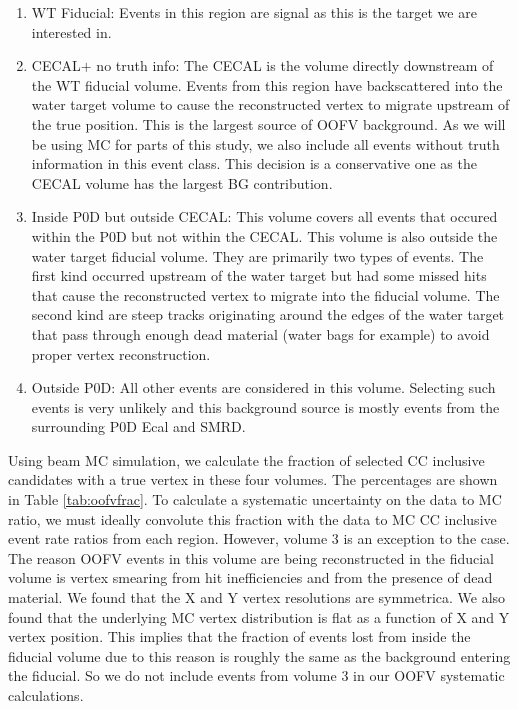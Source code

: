 \begin{enumerate}
\item WT Fiducial: Events in this region are signal as this is the target we are interested in.
\item CECAL$+$ no truth info: The CECAL is the volume directly downstream of the WT fiducial volume. Events from this region have backscattered into the water target volume to cause the reconstructed vertex to migrate upstream of the true position. This is the largest source of OOFV background. As we will be using MC for parts of this study, we also include all events without truth information in this event class. This decision is a conservative one as the CECAL volume has the largest BG contribution.
\item Inside P0D but outside CECAL: This volume covers all events that occured within the P0D but not within the CECAL. This volume is also outside the water target fiducial volume. They are primarily two types of events. The first kind occurred upstream of the water target but had some missed hits that cause the reconstructed vertex to migrate into the fiducial volume. The second kind are steep tracks originating around the edges of the water target that pass through enough dead material (water bags for example) to avoid proper vertex reconstruction.
\item Outside P0D: All other events are considered in this volume. Selecting such events is very unlikely and this background source is mostly events from the surrounding P0D Ecal and SMRD. 
\end{enumerate}

Using beam MC simulation, we calculate the fraction of selected CC inclusive candidates with a true vertex in these four volumes. The percentages are shown in Table \ref{tab:oofvfrac}. To calculate a systematic uncertainty on the data to MC ratio, we must ideally convolute this fraction with the data to MC CC inclusive event rate ratios from each region. However, volume 3 is an exception to the case. The reason OOFV events in this volume are being reconstructed in the fiducial volume is vertex smearing from hit inefficiencies and from the presence of dead material. We found that the X and Y vertex resolutions are symmetrica. We also found that the underlying MC vertex distribution is flat as a function of X and Y vertex position. This implies that the fraction of events lost from inside the fiducial volume due to this reason is roughly the same as the background entering the fiducial. So we do not include events from volume 3 in our OOFV systematic calculations.

